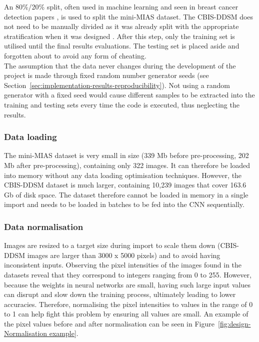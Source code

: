 An 80\%/20\% split, often used in machine learning and seen in breast cancer detection papers \citep{Yue2018}, is used to split the mini-MIAS dataset. The CBIS-DDSM does not need to be manually divided as it was already split with the appropriate stratification when it was designed \citep{Lee2017}. After this step, only the training set is utilised until the final results evaluations. The testing set is placed aside and forgotten about to avoid any form of cheating.\\

The assumption that the data never changes during the development of the project is made through fixed random number generator seeds (see Section~\ref{sec:implementation-results-reproducibility}). Not using a random generator with a fixed seed would cause different samples to be extracted into the training and testing sets every time the code is executed, thus neglecting the results. 

\subsubsection{Data loading}

The mini-MIAS dataset is very small in size (339 Mb before pre-processing, 202 Mb after pre-processing), containing only 322 images. It can therefore be loaded into memory without any data loading optimisation techniques. However, the CBIS-DDSM dataset is much larger, containing 10,239 images that cover 163.6 Gb of disk space. The dataset therefore cannot be loaded in memory in a single import and needs to be loaded in batches to be fed into the CNN sequentially. %

\subsubsection{Data normalisation}

Images are resized to a target size during import to scale them down (CBIS-DDSM images are larger than 3000 x 5000 pixels)  and to avoid having inconsistent inputs. Observing the pixel intensities of the images found in the datasets reveal that they correspond to integers ranging from 0 to 255. However, because the weights in neural networks are small, having such large input values can disrupt and slow down the training process, ultimately leading to lower accuracies. Therefore, normalising the pixel intensities to values in the range of 0 to 1 can help fight this problem by ensuring all values are small. An example of the pixel values before and after normalisation can be seen in Figure~\ref{fig:design-Normalisation example}.

